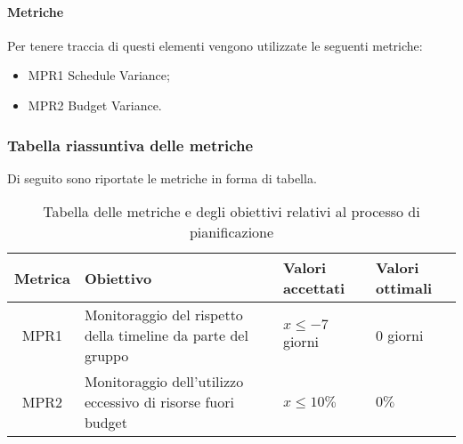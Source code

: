 \paragraph{Metriche}%
Per tenere traccia di questi elementi vengono utilizzate le seguenti metriche:
\begin{itemize}
\item MPR1 Schedule Variance;
\item MPR2 Budget Variance.
\end{itemize}

\subsubsection{Tabella riassuntiva delle metriche}%
Di seguito sono riportate le metriche in forma di tabella.
\begin{table}[H]
		\begin{center}
			\setlength{\aboverulesep}{0pt}
			\setlength{\belowrulesep}{0pt}
			\setlength{\extrarowheight}{.75ex}
			\begin{tabular}{ c C{6cm} C{3cm} C{3cm} }
				\textbf{Metrica} & \textbf{Obiettivo} & \textbf{Valori accettati} & \textbf{Valori ottimali}  \\
				\toprule
				MPR1 & Monitoraggio del rispetto della timeline da parte del gruppo & $ x \leq -7$ giorni & $0$ giorni \\
				MPR2 & Monitoraggio dell'utilizzo eccessivo di risorse fuori budget & $ x \leq 10 \%$ & $0 \%$ \\
				\bottomrule
			\end{tabular}
			\caption{Tabella delle metriche e degli obiettivi relativi al processo di pianificazione}
		\end{center}
	\end{table}



